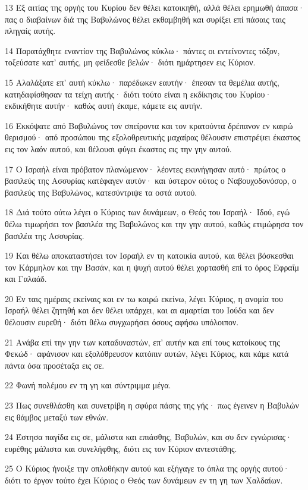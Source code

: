 \par 13 Εξ αιτίας της οργής του Κυρίου δεν θέλει κατοικηθή, αλλά θέλει ερημωθή άπασα· πας ο διαβαίνων διά της Βαβυλώνος θέλει εκθαμβηθή και συρίξει επί πάσαις ταις πληγαίς αυτής.
\par 14 Παρατάχθητε εναντίον της Βαβυλώνος κύκλω· πάντες οι εντείνοντες τόξον, τοξεύσατε κατ' αυτής, μη φείδεσθε βελών· διότι ημάρτησεν εις Κύριον.
\par 15 Αλαλάξατε επ' αυτή κύκλω· παρέδωκεν εαυτήν· έπεσαν τα θεμέλια αυτής, κατηδαφίσθησαν τα τείχη αυτής· διότι τούτο είναι η εκδίκησις του Κυρίου· εκδικήθητε αυτήν· καθώς αυτή έκαμε, κάμετε εις αυτήν.
\par 16 Εκκόψατε από Βαβυλώνος τον σπείροντα και τον κρατούντα δρέπανον εν καιρώ θερισμού· από προσώπου της εξολοθρευτικής μαχαίρας θέλουσιν επιστρέψει έκαστος εις τον λαόν αυτού, και θέλουσι φύγει έκαστος εις την γην αυτού.
\par 17 Ο Ισραήλ είναι πρόβατον πλανώμενον· λέοντες εκυνήγησαν αυτό· πρώτος ο βασιλεύς της Ασσυρίας κατέφαγεν αυτόν· και ύστερον ούτος ο Ναβουχοδονόσορ, ο βασιλεύς της Βαβυλώνος, κατεσύντριψε τα οστά αυτού.
\par 18 Διά τούτο ούτω λέγει ο Κύριος των δυνάμεων, ο Θεός του Ισραήλ· Ιδού, εγώ θέλω τιμωρήσει τον βασιλέα της Βαβυλώνος και την γην αυτού, καθώς ετιμώρησα τον βασιλέα της Ασσυρίας.
\par 19 Και θέλω αποκαταστήσει τον Ισραήλ εν τη κατοικία αυτού, και θέλει βόσκεσθαι τον Κάρμηλον και την Βασάν, και η ψυχή αυτού θέλει χορτασθή επί το όρος Εφραΐμ και Γαλαάδ.
\par 20 Εν ταις ημέραις εκείναις και εν τω καιρώ εκείνω, λέγει Κύριος, η ανομία του Ισραήλ θέλει ζητηθή και δεν θέλει υπάρχει, και αι αμαρτίαι του Ιούδα και δεν θέλουσιν ευρεθή· διότι θέλω συγχωρήσει όσους αφήσω υπόλοιπον.
\par 21 Ανάβα επί την γην των καταδυναστών, επ' αυτήν και επί τους κατοίκους της Φεκώδ· αφάνισον και εξολόθρευσον κατόπιν αυτών, λέγει Κύριος, και κάμε κατά πάντα όσα προσέταξα εις σε.
\par 22 Φωνή πολέμου εν τη γη και σύντριμμα μέγα.
\par 23 Πως συνεθλάσθη και συνετρίβη η σφύρα πάσης της γής· πως έγεινεν η Βαβυλών εις θάμβος μεταξύ των εθνών.
\par 24 Έστησα παγίδα εις σε, μάλιστα και επιάσθης, Βαβυλών, και συ δεν εγνώρισας· ευρέθης μάλιστα και συνελήφθης, διότι εις τον Κύριον αντεστάθης.
\par 25 Ο Κύριος ήνοιξε την οπλοθήκην αυτού και εξήγαγε το όπλα της οργής αυτού· διότι το έργον τούτο έχει Κύριος ο Θεός των δυνάμεων εν τη γη των Χαλδαίων.
